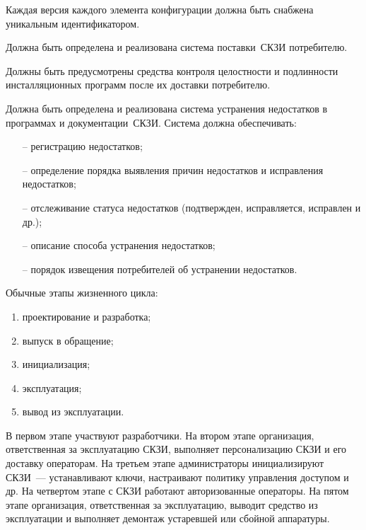 \label{R.LC.CMVersion}
Каждая версия каждого элемента конфигурации 
должна быть снабжена уникальным идентификатором. 

\label{R.LC.Delivery}
Должна быть определена и реализована система поставки~СКЗИ потребителю.  

\label{R.LC.Authenticode}
Должны быть предусмотрены средства контроля целостности и подлинности 
инсталляционных программ после их доставки потребителю. 

\label{R.LC.FlawRemediation}
Должна быть определена и реализована система устранения недостатков 
в программах и документации~СКЗИ.
Система должна обеспечивать:
\begin{itemize}
\item[--]
регистрацию недостатков;
\item[--]
определение порядка выявления причин недостатков
и исправления недостатков;
\item[--]
отслеживание статуса недостатков 
(подтвержден, исправляется, исправлен и др.);
\item[--]
описание способа устранения недостатков;
\item[--]
порядок извещения потребителей об устранении недостатков.
\end{itemize}

Обычные этапы жизненного цикла:
\begin{enumerate}[label=\arabic*)]
\item
проектирование и разработка;
\item
выпуск в обращение;
\item
инициализация;
\item
эксплуатация;
\item
вывод из эксплуатации.
\end{enumerate}

В первом этапе участвуют разработчики. На втором этапе организация, 
ответственная за эксплуатацию СКЗИ, выполняет персонализацию СКЗИ и его 
доставку операторам. На третьем этапе администраторы инициализируют СКЗИ~--- 
устанавливают ключи, настраивают политику управления  
доступом и др. На четвертом этапе с СКЗИ работают авторизованные операторы. 
На пятом этапе организация, ответственная за эксплуатацию, 
выводит средство из эксплуатации и выполняет демонтаж устаревшей или сбойной 
аппаратуры. 
\fi
